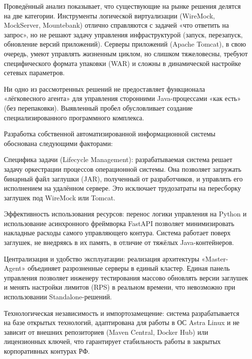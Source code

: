 
Проведённый анализ показывает, что существующие на рынке решения делятся на две категории. Инструменты логической виртуализации (WireMock, MockServer, Mountebank) отлично справляются с задачей «что ответить на запрос», но не решают задачу управления инфраструктурой (запуск, перезапуск, обновление версий приложений). Серверы приложений (Apache Tomcat), в свою очередь, умеют управлять жизненным циклом, но слишком тяжеловесны, требуют специфического формата упаковки (WAR) и сложны в динамической настройке сетевых параметров.

Ни одно из рассмотренных решений не предоставляет функционала «лёгковесного агента» для управления сторонними Java-процессами «как есть» (без перепаковки). Выявленный пробел обусловливает создание специализированного программного комплекса.

Разработка собственной автоматизированной информационной системы обоснована следующими факторами:

\begin{compactlist}
\item Специфика задачи (Lifecycle Management): разрабатываемая система решает задачу оркестрации процессов операционной системы. Она позволяет загружать бинарный файл заглушки (JAR), полученный от разработчиков, и управлять его исполнением на удалённом сервере. Это исключает трудозатраты на пересборку заглушек под WireMock или Tomcat.
\item Эффективность использования ресурсов: перенос логики управления на Python и использование асинхронного фреймворка FastAPI позволяет минимизировать накладные расходы самого управляющего контура. Система работает поверх заглушек, не внедряясь в их память, в отличие от тяжёлых Java-контейнеров.
\item Централизация и удобство эксплуатации: реализация архитектуры «Master-Agent» объединяет разрозненные серверы в единый кластер. Единая панель управления позволяет инженеру тестирования массово обновлять версии заглушек и менять настройки лимитов (RPS) в реальном времени, что невозможно при использовании Standalone-решений.
\item Технологическая независимость и импортозамещение: система разрабатывается на базе открытых технологий, адаптирована для работы в ОС Astra Linux и не зависит от внешних репозиториев (Maven Central, Docker Hub) или лицензионных ключей, что гарантирует стабильность работы в закрытых корпоративных контурах РФ.
\end{compactlist}

